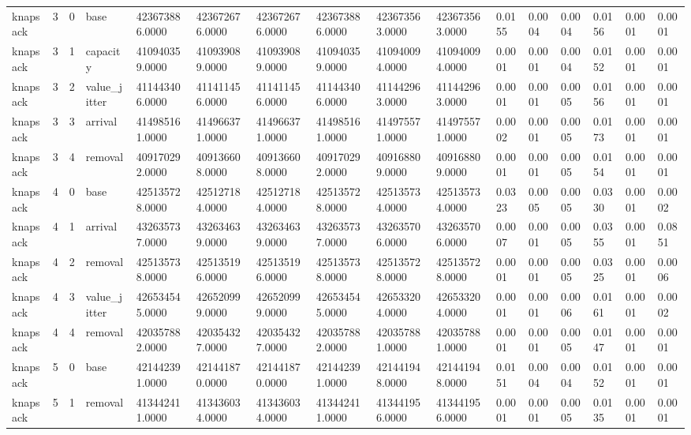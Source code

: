 \begin{table}[t]
\begin{tabular}{llllllllllllllll}
knapsack & 3 & 0 & base & 423673886.0000 & 423672676.0000 & 423672676.0000 & 423673886.0000 & 423673563.0000 & 423673563.0000 & 0.0155 & 0.0004 & 0.0004 & 0.0156 & 0.0001 & 0.0001 \\
knapsack & 3 & 1 & capacity & 410940359.0000 & 410939089.0000 & 410939089.0000 & 410940359.0000 & 410940094.0000 & 410940094.0000 & 0.0001 & 0.0001 & 0.0004 & 0.0152 & 0.0001 & 0.0001 \\
knapsack & 3 & 2 & value\_jitter & 411443406.0000 & 411411456.0000 & 411411456.0000 & 411443406.0000 & 411442963.0000 & 411442963.0000 & 0.0001 & 0.0001 & 0.0005 & 0.0156 & 0.0001 & 0.0001 \\
knapsack & 3 & 3 & arrival & 414985161.0000 & 414966371.0000 & 414966371.0000 & 414985161.0000 & 414975571.0000 & 414975571.0000 & 0.0002 & 0.0001 & 0.0005 & 0.0173 & 0.0001 & 0.0001 \\
knapsack & 3 & 4 & removal & 409170292.0000 & 409136608.0000 & 409136608.0000 & 409170292.0000 & 409168809.0000 & 409168809.0000 & 0.0001 & 0.0001 & 0.0005 & 0.0154 & 0.0001 & 0.0001 \\
knapsack & 4 & 0 & base & 425135728.0000 & 425127184.0000 & 425127184.0000 & 425135728.0000 & 425135734.0000 & 425135734.0000 & 0.0323 & 0.0005 & 0.0005 & 0.0330 & 0.0001 & 0.0002 \\
knapsack & 4 & 1 & arrival & 432635737.0000 & 432634639.0000 & 432634639.0000 & 432635737.0000 & 432635706.0000 & 432635706.0000 & 0.0007 & 0.0001 & 0.0005 & 0.0355 & 0.0001 & 0.0851 \\
knapsack & 4 & 2 & removal & 425135738.0000 & 425135196.0000 & 425135196.0000 & 425135738.0000 & 425135728.0000 & 425135728.0000 & 0.0001 & 0.0001 & 0.0005 & 0.0325 & 0.0001 & 0.0006 \\
knapsack & 4 & 3 & value\_jitter & 426534545.0000 & 426520999.0000 & 426520999.0000 & 426534545.0000 & 426533204.0000 & 426533204.0000 & 0.0001 & 0.0001 & 0.0006 & 0.0161 & 0.0001 & 0.0002 \\
knapsack & 4 & 4 & removal & 420357882.0000 & 420354327.0000 & 420354327.0000 & 420357882.0000 & 420357881.0000 & 420357881.0000 & 0.0001 & 0.0001 & 0.0005 & 0.0147 & 0.0001 & 0.0001 \\
knapsack & 5 & 0 & base & 421442391.0000 & 421441870.0000 & 421441870.0000 & 421442391.0000 & 421441948.0000 & 421441948.0000 & 0.0151 & 0.0004 & 0.0004 & 0.0152 & 0.0001 & 0.0001 \\
knapsack & 5 & 1 & removal & 413442411.0000 & 413436034.0000 & 413436034.0000 & 413442411.0000 & 413441956.0000 & 413441956.0000 & 0.0001 & 0.0001 & 0.0005 & 0.0135 & 0.0001 & 0.0001 \\

\end{tabular}
\end{table}
